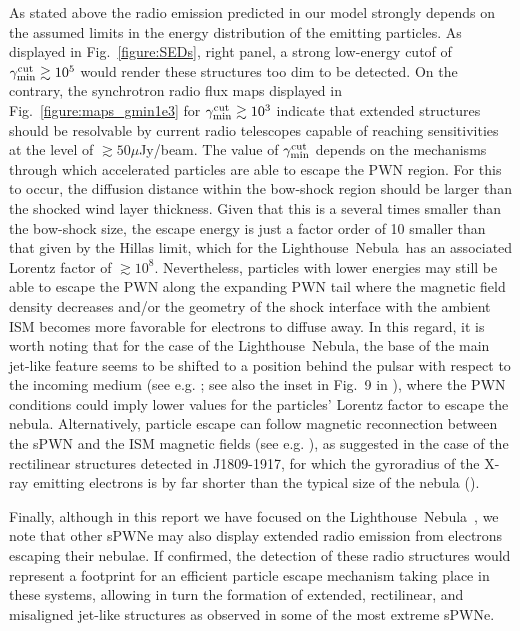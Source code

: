 \documentclass[letter]{aa}
\newcommand{\lneb}{Lighthouse~Nebula~}
\newcommand{\LNEB}{Lighthouse~Nebula}
\begin{document}
As stated above the radio emission predicted in our model strongly depends on the assumed limits in the energy distribution of the emitting particles. As displayed in Fig.~\ref{figure:SEDs}, right panel, a strong low-energy cutof of $\gamma_{\rm min}^{\rm cut} \gtrsim 10^{5}$ would render these structures too dim to be detected. On the contrary, the synchrotron radio flux maps displayed in Fig.~\ref{figure:maps_gmin1e3} for $\gamma_{\rm min}^{\rm cut} \gtrsim 10^{3}$ indicate that extended structures should be resolvable by current radio telescopes capable of reaching sensitivities at the level of $\gtrsim 50 \mu$Jy/beam. The value of $\gamma_{\rm min}^{\rm cut}$ depends on the mechanisms through which accelerated particles are able to escape the PWN region. For this to occur, the diffusion distance within the bow-shock region should be larger than the shocked wind layer thickness. Given that this is a  several times smaller than the bow-shock size, the escape energy is just a factor order of 10 smaller than that given by the Hillas limit, which for the \lneb has an associated Lorentz factor of $\gtrsim 10^8$.
%
Nevertheless, particles with lower energies may still be able to escape the PWN along the expanding PWN tail where the magnetic field density decreases and/or the geometry of the shock interface with the ambient ISM becomes more favorable for electrons to diffuse away. In this regard, it is worth noting that for the case of the \LNEB, the base of the main jet-like feature seems to be shifted to a position behind the pulsar with respect to the incoming medium (see e.g. \citealp{Pavan2016}; see also the inset in Fig.~9 in \citealp{Kargaltsev2017}), where the PWN conditions could imply lower values for the particles' Lorentz factor to escape the nebula. Alternatively, particle escape can follow magnetic reconnection between the sPWN and the ISM magnetic fields (see e.g. \citealp{Barkov2019, Bucciantini2020}), as suggested in the case of the rectilinear structures detected in J1809-1917, for which the gyroradius of the X-ray emitting electrons is by far shorter than the typical size of the nebula (\citealp{Klingler2020}).

Finally, although in this report we have focused on the \lneb, we note that other sPWNe may also display extended radio emission from electrons escaping their nebulae. If confirmed, the detection of these radio structures would represent a footprint for an efficient particle escape mechanism taking place in these systems, allowing in turn the formation of extended, rectilinear, and misaligned jet-like structures as observed in some of the most extreme sPWNe.
\end{document}
